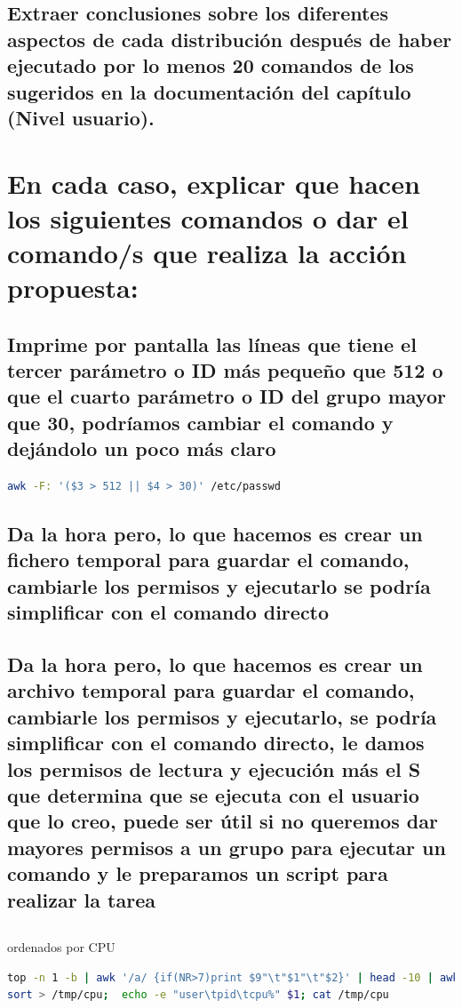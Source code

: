 \documentclass[preprint,11pt]{elsarticle}
\begin{document}
\subsection{Extraer conclusiones sobre los diferentes aspectos de cada distribución
después de haber ejecutado por lo menos 20 comandos de los sugeridos en
la documentación del capítulo (Nivel usuario).}


\section{En cada caso, explicar que hacen los siguientes comandos o dar el
comando/s que realiza la acción propuesta: }

\subsection{Imprime por pantalla las líneas que tiene el tercer parámetro o ID más pequeño que 512 o que el cuarto parámetro o ID del grupo mayor que 30,  podríamos cambiar el comando y dejándolo un poco más claro}
\begin{lstlisting}[language=bash]
awk -F: '($3 > 512 || $4 > 30)' /etc/passwd  
\end{lstlisting}

\subsection{Da la hora pero, lo que hacemos es crear un fichero temporal para guardar el comando, cambiarle los permisos y ejecutarlo se podría simplificar con el comando directo}

\subsection{Da la hora pero, lo que hacemos es crear un archivo temporal para guardar el comando, cambiarle los permisos y ejecutarlo, se podría simplificar con el comando directo, le damos los permisos de lectura y ejecución más el S que determina que se ejecuta con el usuario que lo creo, puede ser útil si no queremos dar mayores permisos a un grupo para ejecutar un comando y le preparamos un script para realizar la tarea}

\subsection{}

ordenados por CPU 
\begin{lstlisting}[language=bash,  basicstyle=\tiny,]
top -n 1 -b | awk '/a/ {if(NR>7)print $9"\t"$1"\t"$2}' | head -10 | awk '{print $3"\t"$2"\t"$1}' |
sort > /tmp/cpu;  echo -e "user\tpid\tcpu%" $1; cat /tmp/cpu
\end{lstlisting}
\end{document}

